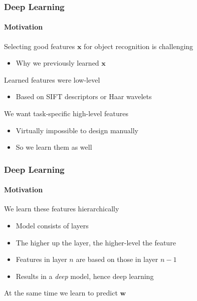 \documentclass[xetex,professionalfont]{beamer}
\renewcommand{\vec}[1]{\ensuremath{\mathbf{#1}}}
\newcommand{\vw}{\vec{w}}
\newcommand{\vx}{\vec{x}}
\renewcommand\emph[1]{\textcolor{tuwcvl_inf_red}{#1}}
\begin{document}

\begin{frame}
\frametitle{Deep Learning}
\framesubtitle{Motivation}

Selecting good features $\vx$ for object recognition is challenging
\begin{itemize}
    \item Why we previously learned $\vx$
\end{itemize}

\bigskip
Learned features were low-level
\begin{itemize}
    \item Based on SIFT descriptors or Haar wavelets
\end{itemize}

\bigskip
We want task-specific high-level features
\begin{itemize}
    \item Virtually impossible to design manually
    \item So we learn them as well
\end{itemize}

\end{frame}


\begin{frame}
\frametitle{Deep Learning}
\framesubtitle{Motivation}

We learn these features hierarchically
\begin{itemize}
    \item Model consists of layers
    \item The higher up the layer, the higher-level the feature
    \item Features in layer $n$ are based on those in layer $n-1$
    \item Results in a \textit{deep} model, hence \emph{deep learning}
\end{itemize}

\bigskip
At the same time we learn to predict $\vw$

\end{frame}

\end{document}
